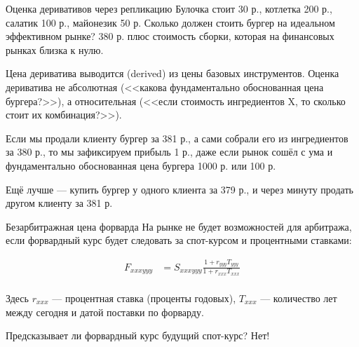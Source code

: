 \documentclass{beamer}
\begin{document}
\begin{frame}{Оценка деривативов через репликацию}
\justify
Булочка стоит 30 р., котлетка 200 р., салатик 100 р., майонезик 50 р. Сколько должен стоить бургер на идеальном эффективном рынке? 380 р. плюс стоимость сборки, которая на финансовых рынках близка к нулю.

\justify
Цена дериватива выводится (derived) из цены базовых инструментов. Оценка дериватива
не абсолютная (<<какова фундаментально обоснованная цена бургера?>>), а относительная (<<если стоимость ингредиентов X, то сколько стоит их комбинация?>>).

\justify
Если мы продали клиенту бургер за 381 р., а сами собрали его из ингредиентов за 380 р., то мы зафиксируем прибыль 1 р., даже если рынок сошёл с ума и фундаментально обоснованная цена бургера 1000 р. или 100 р.

\justify
Ещё лучше --- купить бургер у одного клиента за 379 р., и через минуту продать
другом клиенту за 381 р.
\end{frame}



\begin{frame}{Безарбитражная цена форварда}
\justify
На рынке не будет возможностей для арбитража, если форвардный курс будет следовать за спот-курсом и процентными ставками:

\begin{align*}
F_{xxxyyy} &= S_{xxxyyy} \frac{1 + r_{yyy}T_{yyy}}{1 + r_{xxx}T_{xxx}} \\
\end{align*}

Здесь $r_{xxx}$ --- процентная ставка (проценты годовых), $T_{xxx}$ --- количество лет между сегодня и датой поставки по форварду.

\justify
Предсказывает ли форвардный курс будущий спот-курс? Нет!
\end{frame}
\end{document}
